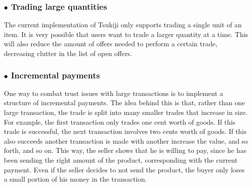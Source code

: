 \subsubsection*{$\bullet$ Trading large quantities}
The current implementation of Tsukiji only supports trading a single unit of an item.
It is very possible that users want to trade a larger quantity at a time.
This will also reduce the amount of offers needed to perform a certain trade, decreasing clutter in the list of open offers.

\subsubsection*{$\bullet$ Incremental payments}
One way to combat trust issues with large transactions is to implement a structure of incremental payments.
The idea behind this is that, rather than one large transaction, the trade is split into many smaller trades that increase in size.
For example, the first transaction only trades one cent worth of goods. If this trade is successful, the next transaction involves two cents worth of goods. If this also succeeds another transaction is made with another increase the value, and so forth, and so on.
This way, the seller shows that he is willing to pay, since he has been sending the right amount of the product, corresponding with the current payment.
Even if the seller decides to not send the product, the buyer only loses a small portion of his money in the transaction.